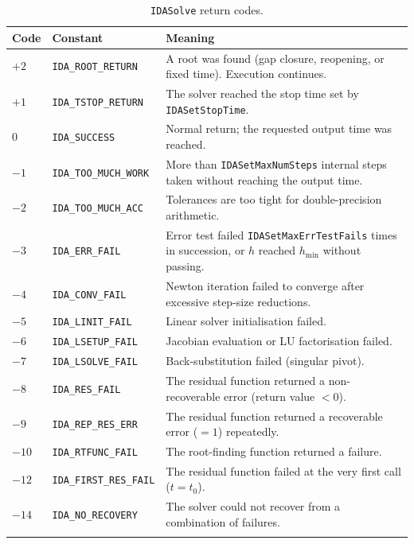\begin{refsection}
\begin{longtable}{p{1.2cm}p{5cm}p{7.5cm}}
  \toprule
  Code & Constant & Meaning \\
  \midrule
  \endhead
  $+2$  & \texttt{IDA\_ROOT\_RETURN}      & A root was found (gap closure, reopening, or fixed time). Execution continues. \\
  $+1$  & \texttt{IDA\_TSTOP\_RETURN}     & The solver reached the stop time set by \texttt{IDASetStopTime}. \\
  $0$   & \texttt{IDA\_SUCCESS}           & Normal return; the requested output time was reached. \\
  $-1$  & \texttt{IDA\_TOO\_MUCH\_WORK}   & More than \texttt{IDASetMaxNumSteps} internal steps taken without reaching the output time. \\
  $-2$  & \texttt{IDA\_TOO\_MUCH\_ACC}    & Tolerances are too tight for double-precision arithmetic. \\
  $-3$  & \texttt{IDA\_ERR\_FAIL}         & Error test failed \texttt{IDASetMaxErrTestFails} times in succession, or $h$ reached $h_\mathrm{min}$ without passing. \\
  $-4$  & \texttt{IDA\_CONV\_FAIL}        & Newton iteration failed to converge after excessive step-size reductions. \\
  $-5$  & \texttt{IDA\_LINIT\_FAIL}       & Linear solver initialisation failed. \\
  $-6$  & \texttt{IDA\_LSETUP\_FAIL}      & Jacobian evaluation or LU factorisation failed. \\
  $-7$  & \texttt{IDA\_LSOLVE\_FAIL}      & Back-substitution failed (singular pivot). \\
  $-8$  & \texttt{IDA\_RES\_FAIL}         & The residual function returned a non-recoverable error (return value $< 0$). \\
  $-9$  & \texttt{IDA\_REP\_RES\_ERR}     & The residual function returned a recoverable error ($= 1$) repeatedly. \\
  $-10$ & \texttt{IDA\_RTFUNC\_FAIL}      & The root-finding function returned a failure. \\
  $-12$ & \texttt{IDA\_FIRST\_RES\_FAIL}  & The residual function failed at the very first call ($t = t_0$). \\
  $-14$ & \texttt{IDA\_NO\_RECOVERY}      & The solver could not recover from a combination of failures. \\
  \bottomrule
  \caption{\texttt{IDASolve} return codes.}
  \label{tab:retval}
\end{longtable}


\end{refsection}
